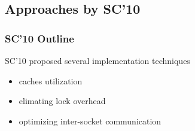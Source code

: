 \documentclass[]{beamer}
\begin{document}
\subsection{Approaches by SC'10}

\begin{frame}
  \frametitle{SC'10 Outline}
  SC'10 proposed several implementation techniques
  \begin{itemize}
    \item caches utilization
    \item elimating lock overhead
    \item optimizing inter-socket communication
  \end{itemize}
\end{frame}
\end{document}

